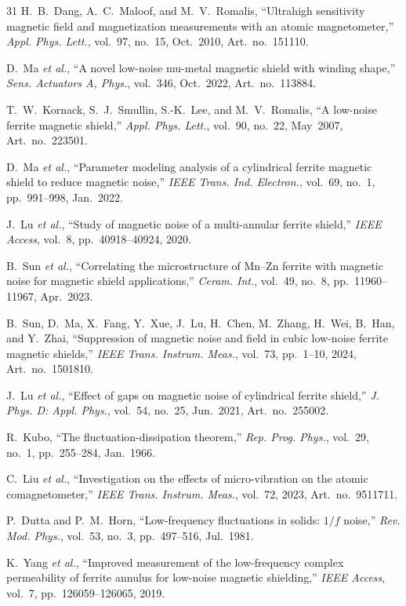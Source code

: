 \documentclass[letterpaper,journal]{IEEEtran}
\begin{document}
\begin{thebibliography}{31}
H.~B.~Dang, A.~C.~Maloof, and M.~V.~Romalis,
``Ultrahigh sensitivity magnetic field and magnetization measurements with an atomic magnetometer,''
\textit{Appl. Phys. Lett.}, vol.~97, no.~15, Oct.~2010, Art.~no.~151110.

D.~Ma \textit{et al.},
``A novel low-noise mu-metal magnetic shield with winding shape,''
\textit{Sens. Actuators A, Phys.}, vol.~346, Oct.~2022, Art.~no.~113884.

T.~W.~Kornack, S.~J.~Smullin, S.-K.~Lee, and M.~V.~Romalis,
``A low-noise ferrite magnetic shield,''
\textit{Appl. Phys. Lett.}, vol.~90, no.~22, May~2007, Art.~no.~223501.

D.~Ma \textit{et al.},
``Parameter modeling analysis of a cylindrical ferrite magnetic shield to reduce magnetic noise,''
\textit{IEEE Trans. Ind. Electron.}, vol.~69, no.~1, pp.~991--998, Jan.~2022.

J.~Lu \textit{et al.},
``Study of magnetic noise of a multi-annular ferrite shield,''
\textit{IEEE Access}, vol.~8, pp.~40918--40924, 2020.

B.~Sun \textit{et al.},
``Correlating the microstructure of Mn--Zn ferrite with magnetic noise for magnetic shield applications,''
\textit{Ceram. Int.}, vol.~49, no.~8, pp.~11960--11967, Apr.~2023.

B.~Sun, D.~Ma, X.~Fang, Y.~Xue, J.~Lu, H.~Chen, M.~Zhang, H.~Wei, B.~Han, and Y.~Zhai,
``Suppression of magnetic noise and field in cubic low-noise ferrite magnetic shields,''
\textit{IEEE Trans. Instrum. Meas.}, vol.~73, pp.~1--10, 2024, Art.~no.~1501810.

J.~Lu \textit{et al.},
``Effect of gaps on magnetic noise of cylindrical ferrite shield,''
\textit{J. Phys. D: Appl. Phys.}, vol.~54, no.~25, Jun.~2021, Art.~no.~255002.

R.~Kubo,
``The fluctuation-dissipation theorem,''
\textit{Rep. Prog. Phys.}, vol.~29, no.~1, pp.~255--284, Jan.~1966.

C.~Liu \textit{et al.},
``Investigation on the effects of micro-vibration on the atomic comagnetometer,''
\textit{IEEE Trans. Instrum. Meas.}, vol.~72, 2023, Art.~no.~9511711.

P.~Dutta and P.~M.~Horn,
``Low-frequency fluctuations in solids: $1/f$ noise,''
\textit{Rev. Mod. Phys.}, vol.~53, no.~3, pp.~497--516, Jul.~1981.

K.~Yang \textit{et al.},
``Improved measurement of the low-frequency complex permeability of ferrite annulus for low-noise magnetic shielding,''
\textit{IEEE Access}, vol.~7, pp.~126059--126065, 2019.


\end{thebibliography}
\end{document}

